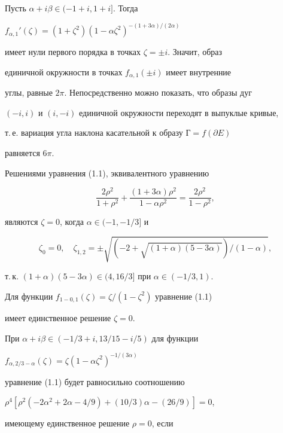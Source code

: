 Пусть $\alpha+i\beta\in(-1+i,1+i]$. Тогда


$f_{\alpha,1}'(\zeta)=(1+\zeta^2)(1-\alpha\zeta^2)^{-(1+3\alpha)/


(2\alpha)}$


имеет нули первого порядка в точках $\zeta=\pm i$. Значит, образ


единичной окружности в точках $f_{\alpha,1}(\pm i)$ имеет внутренние


углы, равные $2\pi$. Непосредственно можно показать, что образы дуг


$(-i,i)$ и $(i,-i)$ единичной окружности переходят в выпуклые кривые, 


т.\,е. вариация угла наклона касательной к образу Г$=f(\partial E)$


равняется $6\pi$.





Решениями уравнения (1.1), эквивалентного уравнению


$$


\frac{2\rho^2}{1+\rho^2}+\frac{(1+3\alpha)\rho^2}{1-\alpha\rho^2}=


\frac{2\rho^2}{1-\rho^2}, 


$$


являются $\zeta=0$, когда $\alpha\in(-1,-1/3]$ и 


\begin{equation}


\zeta_0=0,\quad


\zeta_{1,2}=\pm\sqrt{(-2+\sqrt{(1+\alpha)(5-3\alpha)})/(1-\alpha)},


\end{equation}


т.\,к. $(1+\alpha)(5-3\alpha)\in(4,16/3]$ при $\alpha\in(-1/3,1)$. 


Для функции $f_{1-0,1}(\zeta)=\zeta/(1-\zeta^2)$ уравнение (1.1)


имеет единственное решение $\zeta=0$. 





При $\alpha+i\beta\in(-1/3+i,13/15-i/5)$ для функции


$f_{\alpha,2/3-\alpha}(\zeta)=\zeta(1-\alpha\zeta^2)^{-1/(3\alpha)}$


уравнение (1.1) будет равносильно соотношению


$\rho^4[\rho^2(-2\alpha^2+2\alpha-4/9)+(10/3)\alpha-(26/9)]=0$,


имеющему единственное решение $\rho=0$, если


